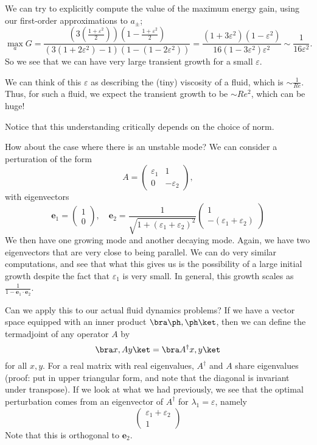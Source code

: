 \documentclass[a4paper]{article}
\begin{document}
We can try to explicitly compute the value of the maximum energy gain, using our first-order approximations to $a_{\pm}$;
\[
  \max_a G = \frac{\left(3 \left(\frac{1 + \varepsilon^2}{2}\right)\right)\left(1 - \frac{1 + \varepsilon^2}{2}\right)}{(3(1 + 2\varepsilon^2) - 1)(1 - (1 - 2 \varepsilon^2))} = \frac{(1 + 3 \varepsilon^2)(1 - \varepsilon^2)}{16(1 - 3 \varepsilon^2)\varepsilon^2} \sim \frac{1}{16 \varepsilon^2}.
\]
So we see that we can have very large transient growth for a small $\varepsilon$.

We can think of this $\varepsilon$ as describing the (tiny) viscosity of a fluid, which is $\sim \frac{1}{Re}$. Thus, for such a fluid, we expect the transient growth to be $\sim Re^2$, which can be huge!

Notice that this understanding critically depends on the choice of norm. %

How about the case where there is an unstable mode? We can consider a perturation of the form
\[
  A =
  \begin{pmatrix}
    \varepsilon_1 & 1\\
    0 & -\varepsilon_2
  \end{pmatrix},
\]
with eigenvectors
\[
  \mathbf{e}_1 =
  \begin{pmatrix}
    1 \\0
  \end{pmatrix},\quad
  \mathbf{e}_2 = \frac{1}{\sqrt{1 + (\varepsilon_1 + \varepsilon_2)^2}}
  \begin{pmatrix}
    1\\
     -(\varepsilon_1 + \varepsilon_2)
  \end{pmatrix}
\]
We then have one growing mode and another decaying mode. Again, we have two eigenvectors that are very close to being parallel. We can do very similar computations, and see that what this gives us is the possibility of a large initial growth despite the fact that $\varepsilon_1$ is very small. In general, this growth scales as $\frac{1}{1 - \mathbf{e}_1 \cdot \mathbf{e}_2}$.

Can we apply this to our actual fluid dynamics problems? If we have a vector space equipped with an inner product $\bra \ph, \ph\ket$, then we can define the term{adjoint} of any operator $A$ by
\[
  \bra x, Ay\ket = \bra A^\dagger x, y\ket
\]
for all $x, y$. For a real matrix with real eigenvalues, $A^\dagger$ and $A$ share eigenvalues (proof: put in upper triangular form, and note that the diagonal is invariant under transpose). If we look at what we had previously, we see that the optimal perturbation comes from an eigenvector of $A^\dagger$ for $\lambda_1 = \varepsilon$, namely
\[
  \begin{pmatrix}
    \varepsilon_1 + \varepsilon_2 \\ 1
  \end{pmatrix}
\]
Note that this is orthogonal to $\mathbf{e}_2$.
\end{document}
